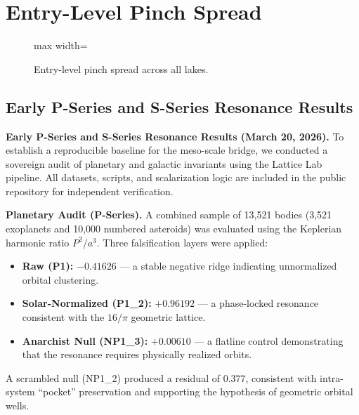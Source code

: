 \documentclass[11pt, letterpaper, openany]{book}
\begin{document}
\section{Entry-Level Pinch Spread}

\begin{figure}[H]
\centering
\begin{adjustbox}{max width=\textwidth}
\end{adjustbox}
\caption{Entry-level pinch spread across all lakes.}
\end{figure}
\clearpage


\subsection*{Early P-Series and S-Series Resonance Results}
\noindent\textbf{Early P-Series and S-Series Resonance Results (March 20, 2026).}
To establish a reproducible baseline for the meso-scale bridge, we conducted a sovereign audit of planetary and galactic invariants using the Lattice Lab pipeline. All datasets, scripts, and scalarization logic are included in the public repository for independent verification.

\medskip
\noindent\textbf{Planetary Audit (P-Series).}
A combined sample of 13{,}521 bodies (3{,}521 exoplanets and 10{,}000 numbered asteroids) was evaluated using the Keplerian harmonic ratio $P^{2}/a^{3}$. Three falsification layers were applied:
\begin{itemize}
    \item \textbf{Raw (P1):} $-0.41626$ --- a stable negative ridge indicating unnormalized orbital clustering.
    \item \textbf{Solar-Normalized (P1\_2):} $+0.96192$ --- a phase-locked resonance consistent with the $16/\pi$ geometric lattice.
    \item \textbf{Anarchist Null (NP1\_3):} $+0.00610$ --- a flatline control demonstrating that the resonance requires physically realized orbits.
\end{itemize}
A scrambled null (NP1\_2) produced a residual of $0.377$, consistent with intra-system “pocket” preservation and supporting the hypothesis of geometric orbital wells.
\end{document}
